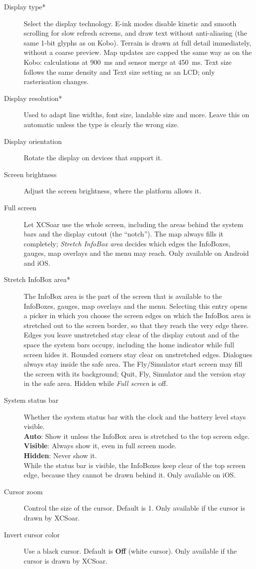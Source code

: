 \begin{description}
\item[Display type*]  Select the display technology. E-ink modes disable
  kinetic and smooth scrolling for slow refresh screens, and draw text
  without anti-aliasing (the same 1-bit glyphs as on Kobo). Terrain is
  drawn at full detail immediately, without a coarse preview. Map
  updates are capped the same way as on the Kobo: calculations at
  900~ms and sensor merge at 450~ms. Text size
  follows the same density and Text size setting as an LCD; only
  rasterisation changes.
\item[Display resolution*]  Used to adapt line widths, font size, landable
  size and more. Leave this on automatic unless the type is clearly
  the wrong size.
\item[Display orientation]  Rotate the display on devices that support it.
\item[Screen brightness]  Adjust the screen brightness, where the platform
  allows it.
\item[Full screen]  Let XCSoar use the whole screen, including the areas
  behind the system bars and the display cutout (the ``notch''). The map
  always fills it completely; \emph{Stretch InfoBox area} decides which
  edges
  the InfoBoxes, gauges, map overlays and the menu may reach.
  Only available on Android and iOS.
\item[Stretch InfoBox area*]  The InfoBox area is the part of the screen
  that is available to the InfoBoxes, gauges, map overlays and the
  menu. Selecting
  this entry opens a picker in which you choose the screen edges on which
  the InfoBox area is stretched out to the screen border, so that they
  reach the very edge
  there. Edges you leave unstretched stay clear of the display
  cutout and of the space the system bars occupy, including the
  home indicator while full screen hides it. Rounded corners stay
  clear on unstretched edges. Dialogues always stay inside the
  safe area. The Fly/Simulator start screen may fill the screen
  with its background; Quit, Fly, Simulator and the version stay
  in the safe area.
  Hidden while \emph{Full screen} is off.
\item[System status bar]  Whether the system status bar with the clock and
  the battery level stays visible. \\
  {\bf Auto}: Show it unless the InfoBox area is stretched to the top
  screen edge. \\
  {\bf Visible}: Always show it, even in full screen mode. \\
  {\bf Hidden}: Never show it. \\
  While the status bar is visible, the InfoBoxes keep clear of the top screen
  edge, because they cannot be drawn behind it.
  Only available on iOS.
\item[Cursor zoom]  Control the size of the cursor. Default is 1.
  Only available if the cursor is drawn by XCSoar.
\item[Invert cursor color]  Use a black cursor. Default is {\bf Off}
  (white cursor). Only available if the cursor is drawn by XCSoar.
\end{description}



